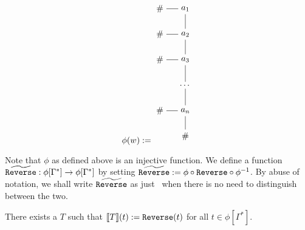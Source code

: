 \[
\phi(w) := \begin{tikzpicture}
    [level distance=3em]
    \node {$a_1$}
    child[grow=west] { node{$\#$} }
    child[grow=south] {
        node {$a_2$}
        child[grow=west] { node{$\#$} }
        child[grow=south] {
            node{$a_3$}
            child[grow=west] { node{$\#$} }
            child[grow=south] {
                node{$\dots$}
                child[grow=south] {
                    node{$a_n$}
                    child[grow=west] { node{$\#$} }
                    child[grow=south] { node{$\#$} }
                }
            }
        }
    };
\end{tikzpicture}
\]

Note that $\phi$ as defined above is an injective function. We define a function $\widetilde{\texttt{Reverse}} : \phi[\Gamma^*] \to \phi[\Gamma^*]$ by setting $\widetilde{\texttt{Reverse}} := \phi \circ \texttt{Reverse} \circ \phi^{-1}$. By abuse of notation, we shall write $\widetilde{\texttt{Reverse}}$ as just \rev\ when there is no need to distinguish between the two.

\begin{theorem}\cite{MSV2000}
    There exists a  $T$ such that $\llbracket T \rrbracket(t) := \texttt{Reverse}(t)$ for all $t \in \phi[\Gamma^*]$.
\end{theorem}

